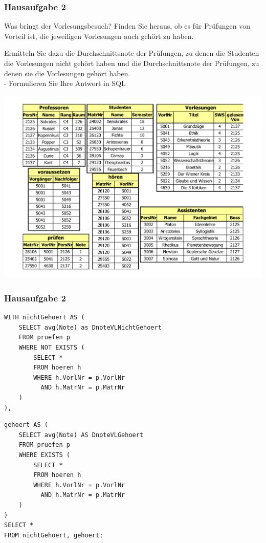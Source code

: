 \begin{frame}[fragile]
	\frametitle{Hausaufgabe 2}
	\vspace{0.25cm}

	\begin{multicols}{2}
		Was bringt der Vorlesungsbesuch? Finden Sie heraus, ob es für Prüfungen von Vorteil ist, 
		die jeweiligen Vorlesungen auch gehört zu haben. 
		
		Ermitteln Sie dazu die Durchschnittsnote der Prüfungen, zu denen die Studenten 
		die Vorlesungen nicht gehört haben und die Durchschnittsnote der 
		Prüfungen, zu denen sie die Vorlesungen gehört haben. \\
		- Formulieren Sie Ihre Antwort in SQL
		\vfill\columnbreak

		\begin{center}
			\includegraphics[height=.6\paperheight]{../img/uni.pdf}
		\end{center}
	\end{multicols}
\end{frame}

\begin{frame}[fragile]
	\frametitle{Hausaufgabe 2}
	\vspace{0.25cm}

	\begin{multicols}{2}
		\begin{verbatim}
WITH nichtGehoert AS (
	SELECT avg(Note) as DnoteVLNichtGehoert
	FROM pruefen p
	WHERE NOT EXISTS (
		SELECT *
		FROM hoeren h
		WHERE h.VorlNr = p.VorlNr
		  AND h.MatrNr = p.MatrNr
	)
),
		\end{verbatim}
		\vfill\columnbreak

		\begin{verbatim}
gehoert AS (
	SELECT avg(Note) AS DnoteVLGehoert
	FROM pruefen p
	WHERE EXISTS (
		SELECT *
		FROM hoeren h
		WHERE h.VorlNr = p.VorlNr
		  AND h.MatrNr = p.MatrNr
	)
)
SELECT *
FROM nichtGehoert, gehoert;
		\end{verbatim}
	\end{multicols}
\end{frame}


